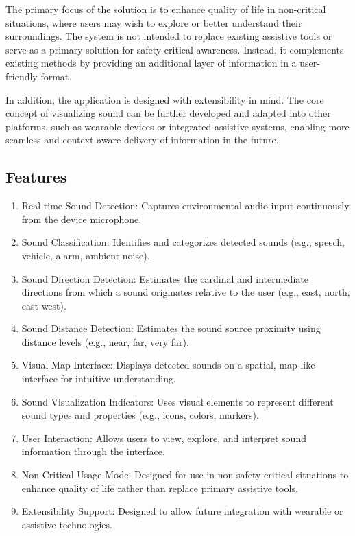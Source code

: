The primary focus of the solution is to enhance quality of life in non-critical situations, 
where users may wish to explore or better understand their surroundings. 
The system is not intended to replace existing assistive tools or serve as a primary solution for safety-critical awareness. 
Instead, it complements existing methods by providing an additional layer of information in a user-friendly format.

In addition, the application is designed with extensibility in mind. 
The core concept of visualizing sound can be further developed and adapted into other platforms, 
such as wearable devices or integrated assistive systems, 
enabling more seamless and context-aware delivery of information in the future.

\subsection{Features}
\label{subsection:features}

\begin{enumerate}[leftmargin=80pt]
    \item Real-time Sound Detection: Captures environmental audio input continuously from the device microphone.
    \item Sound Classification: Identifies and categorizes detected sounds (e.g., speech, vehicle, alarm, ambient noise).
    \item Sound Direction Detection: Estimates the cardinal and intermediate directions from which a sound originates relative to the user (e.g., east, north, east-west).
    \item Sound Distance Detection: Estimates the sound source proximity using distance levels (e.g., near, far, very far).
    \item Visual Map Interface: Displays detected sounds on a spatial, map-like interface for intuitive understanding.
    \item Sound Visualization Indicators: Uses visual elements to represent different sound types and properties (e.g., icons, colors, markers).
    \item User Interaction: Allows users to view, explore, and interpret sound information through the interface.
    \item Non-Critical Usage Mode: Designed for use in non-safety-critical situations to enhance quality of life rather than replace primary assistive tools.
    \item Extensibility Support: Designed to allow future integration with wearable or assistive technologies.
\end{enumerate}

